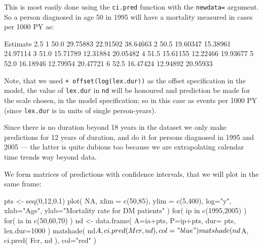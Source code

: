\begin{enumerate}[resume]
  This is most easily done using the \texttt{ci.pred} function with
  the \texttt{newdata=} argument. So a person diagnosed in age 50 in
  1995 will have a mortality measured in cases per 1000 PY as:
\begin{Schunk}
\begin{Soutput}
       Estimate     2.5%    97.5%
1 50.0 29.75883 22.91502 38.64663
2 50.5 19.60347 15.38961 24.97114
3 51.0 15.71789 12.31884 20.05482
4 51.5 15.61155 12.22466 19.93677
5 52.0 16.18946 12.79954 20.47721
6 52.5 16.47424 12.94892 20.95933
\end{Soutput}
\end{Schunk}
Note, that we used \texttt{+ offset(log(lex.dur))} as the offset
specification in the model, the value of \texttt{lex.dur} in
\texttt{nd} will be honoured and prediction be made for the scale
chosen, in the model specification; so in this case as events per 1000
PY (since \texttt{lex.dur} is in units of single person-years).

Since there is no duration beyond 18 years in the dataset we only make
predictions for 12 years of duration, and do it for persons diagnosed
in 1995 and 2005 --- the latter is quite dubious too because we are
extrapolating calendar time trends way beyond data.
  
We form matrices of predictions with confidence intervals, that we
will plot in the same frame:
\begin{Schunk}
\begin{Sinput}
 pts <- seq(0,12,0.1)
 plot( NA, xlim = c(50,85), ylim = c(5,400), log="y",
           xlab="Age", ylab="Mortality rate for DM patients" )
 for( ip in c(1995,2005) )
 for( ia in c(50,60,70) )
    {
 nd <- data.frame( A=ia+pts,
                   P=ip+pts,
                 dur=   pts,
             lex.dur=1000 )
 matshade( nd$A, ci.pred( Mcr, nd ), col="blue" )
 matshade( nd$A, ci.pred( Fcr, nd ), col="red" )
    }
\end{Sinput}
\end{Schunk}



\end{enumerate}
